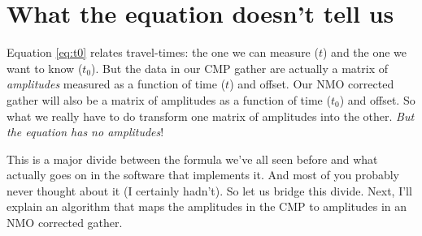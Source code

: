\section{What the equation doesn't tell us}

Equation \ref{eq:t0} relates travel-times: the one we can measure ($t$)
and the one we want to know ($t_0$).
But the data in our CMP gather are actually a matrix of \textit{amplitudes}
measured as a function of time ($t$) and offset.
Our NMO corrected gather will also be a matrix of amplitudes as a function of
time ($t_0$) and offset.
So what we really have to do transform one matrix of amplitudes into the other.
\textit{But the equation has no amplitudes}!

This is a major divide between the formula we've all seen before and what
actually goes on in the software that implements it.
And most of you probably never thought about it (I certainly hadn't).
So let us bridge this divide.
Next, I'll explain an algorithm that maps the amplitudes in the CMP to
amplitudes in an NMO corrected gather.
